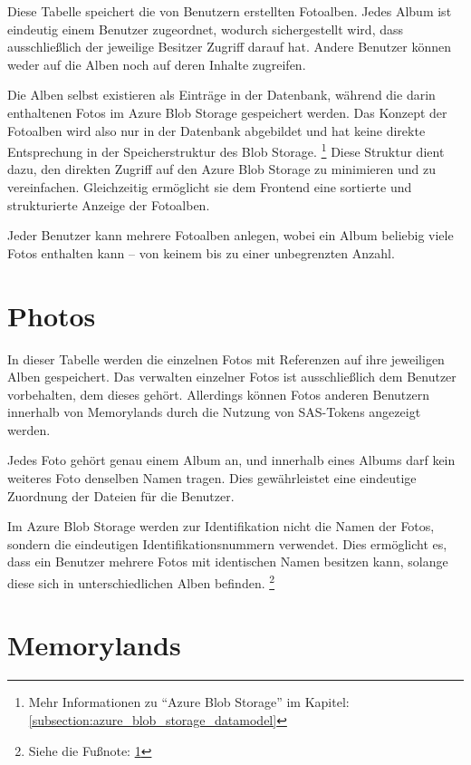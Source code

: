 Diese Tabelle speichert die von Benutzern erstellten Fotoalben. Jedes Album ist eindeutig einem 
Benutzer zugeordnet, wodurch sichergestellt wird, dass ausschließlich der jeweilige Besitzer 
Zugriff darauf hat. Andere Benutzer können weder auf die Alben noch auf deren Inhalte zugreifen.

Die Alben selbst existieren als Einträge in der Datenbank, während die darin enthaltenen Fotos 
im Azure Blob Storage gespeichert werden. Das Konzept der Fotoalben wird also nur in der Datenbank 
abgebildet und hat keine direkte Entsprechung in der Speicherstruktur des Blob Storage. \footnote{\label{azure-blob-storage-note}Mehr Informationen zu ``Azure Blob Storage'' im Kapitel: \ref{subsection:azure_blob_storage_datamodel}}
Diese Struktur dient dazu, den direkten Zugriff auf den Azure Blob Storage zu minimieren und 
zu vereinfachen. Gleichzeitig ermöglicht sie dem Frontend eine sortierte und strukturierte 
Anzeige der Fotoalben.

Jeder Benutzer kann mehrere Fotoalben anlegen, wobei ein Album beliebig viele Fotos enthalten 
kann -- von keinem bis zu einer unbegrenzten Anzahl.

\section{Photos}

In dieser Tabelle werden die einzelnen Fotos mit Referenzen auf ihre jeweiligen Alben gespeichert. 
Das verwalten einzelner Fotos ist ausschließlich dem Benutzer vorbehalten, dem dieses gehört. 
Allerdings können Fotos anderen Benutzern innerhalb von Memorylands durch die Nutzung von 
SAS-Tokens angezeigt werden.

Jedes Foto gehört genau einem Album an, und innerhalb eines Albums darf kein weiteres 
Foto denselben Namen tragen. Dies gewährleistet eine eindeutige Zuordnung der Dateien für die
Benutzer.

Im Azure Blob Storage werden zur Identifikation nicht die Namen der Fotos, sondern die 
eindeutigen Identifikationsnummern verwendet. Dies ermöglicht es, dass ein Benutzer mehrere
Fotos mit identischen Namen besitzen kann, solange diese sich in unterschiedlichen Alben befinden.
\footnote{Siehe die Fußnote: \ref{azure-blob-storage-note}}

\section{Memorylands}

